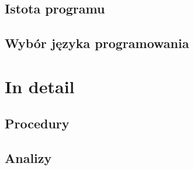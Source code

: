 \documentclass[a4paper, justified]{tufte-book}
\begin{document}
\section{Istota programu}
\section{Wybór języka programowania}

\chapter{In detail}
\section{Procedury}
\section{Analizy}

\backmatter


\end{document}
